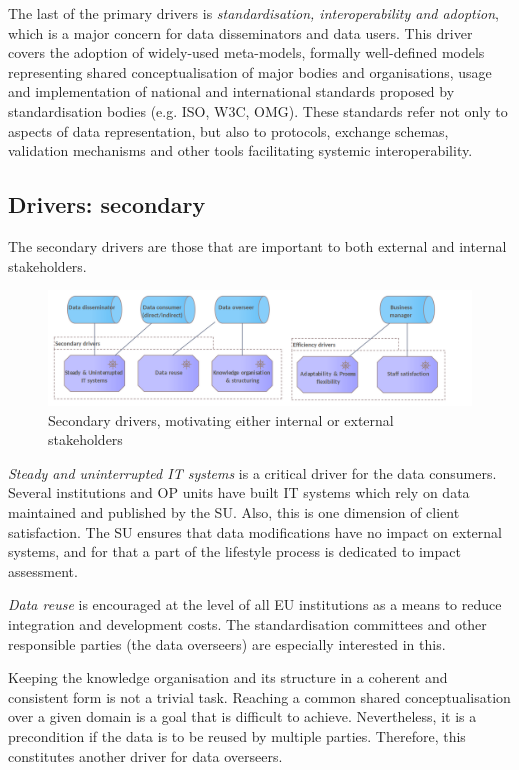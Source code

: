 	The last of the primary drivers is \textit{standardisation, interoperability and adoption}, which is a major concern for data disseminators and data users. This driver covers the adoption of widely-used meta-models, formally well-defined models representing shared conceptualisation of major bodies and organisations, usage and implementation of national and international standards proposed by standardisation bodies (e.g. ISO, W3C, OMG). These standards refer not only to aspects of data representation, but also to protocols, exchange schemas, validation mechanisms and other tools facilitating systemic interoperability. 
	
	\subsection{Drivers: secondary}
	The secondary drivers are those that are important to both external and internal stakeholders.
	
	\begin{figure}[h!]
		\centering
		\includegraphics[width=1.05\textwidth]{images/motivation/Secondary drivers.png}
		\caption{Secondary drivers, motivating either internal or external stakeholders}
		\label{fig:secondary drivers}
	\end{figure}

	\textit{Steady and uninterrupted IT systems} is a critical driver for the data consumers. Several institutions and OP units have built IT systems which rely on data maintained and published by the SU. Also, this is one dimension of client satisfaction. The SU ensures that data modifications have no impact on external systems, and for that a part of the lifestyle process is dedicated to impact assessment. 
	
	\textit{Data reuse} is encouraged at the level of all EU institutions as a means to reduce integration and development costs. The standardisation committees and other responsible parties (the data overseers) are especially interested in this. 
	
	Keeping the knowledge organisation and its structure in a coherent and consistent form is not a trivial task. Reaching a common shared conceptualisation over a given domain is a goal that is difficult to achieve. Nevertheless, it is a precondition if the data is to be reused by multiple parties. Therefore, this constitutes another driver for data overseers. 
	
